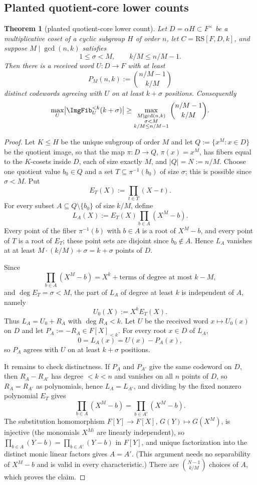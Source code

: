 \documentclass[11pt]{article}
\newtheorem{theorem}{Theorem}[section]
\theoremstyle{definition}
\theoremstyle{remark}
\newcommand{\RS}{\mathrm{RS}}
\begin{document}
\subsection{Planted quotient-core lower counts}

\begin{theorem}[planted quotient-core lower count]\label{thm:capf-planted}
Let $D=\alpha H\subset F^\times$ be a multiplicative coset of a cyclic subgroup $H$ of order $n$, let $C=\RS[F,D,k]$, and suppose $M\mid\gcd(n,k)$ satisfies
\[
        1\le \sigma<M,
        \qquad
        k/M\le n/M-1.
\]
Then there is a received word $U:D\to F$ with at least
\[
        P_M(n,k):=\binom{n/M-1}{k/M}
\]
distinct codewords agreeing with $U$ on at least $k+\sigma$ positions.  Consequently
\[
\max_U \bigl|\ImgFib_U^{<k}(k+\sigma)\bigr|
\ge
\max_{\substack{M\mid\gcd(n,k)\\ \sigma<M\\ k/M\le n/M-1}}
\binom{n/M-1}{k/M}.
\]
\end{theorem}

\begin{proof}
Let $K\le H$ be the unique subgroup of order $M$ and let $Q:=\{x^M:x\in D\}$ be the quotient image, so that the map $\pi:D\to Q$, $\pi(x)=x^M$, has fibers equal to the $K$-cosets inside $D$, each of size exactly $M$, and $|Q|=N:=n/M$.  Choose one quotient value $b_0\in Q$ and a set $T\subseteq\pi^{-1}(b_0)$ of size $\sigma$; this is possible since $\sigma<M$.  Put
\[
        E_T(X):=\prod_{t\in T}(X-t).
\]
For every subset $A\subseteq Q\setminus\{b_0\}$ of size $k/M$, define
\[
        L_A(X):=E_T(X)\prod_{b\in A}(X^M-b).
\]
Every point of the fiber $\pi^{-1}(b)$ with $b\in A$ is a root of $X^M-b$, and every point of $T$ is a root of $E_T$; these point sets are disjoint since $b_0\notin A$.  Hence $L_A$ vanishes at at least $M\cdot(k/M)+\sigma=k+\sigma$ points of $D$.

Since
\[
        \prod_{b\in A}(X^M-b)=X^k+\text{terms of degree at most }k-M,
\]
and $\deg E_T=\sigma<M$, the part of $L_A$ of degree at least $k$ is independent of $A$, namely
\[
        U_0(X):=X^kE_T(X).
\]
Thus $L_A=U_0+R_A$ with $\deg R_A<k$.  Let $U$ be the received word $x\mapsto U_0(x)$ on $D$ and let $P_A:=-R_A\in F[X]_{<k}$.  For every root $x\in D$ of $L_A$,
\[
        0=L_A(x)=U(x)-P_A(x),
\]
so $P_A$ agrees with $U$ on at least $k+\sigma$ positions.

It remains to check distinctness.  If $P_A$ and $P_{A'}$ give the same codeword on $D$, then $R_A-R_{A'}$ has degree $<k<n$ and vanishes on all $n$ points of $D$, so $R_A=R_{A'}$ as polynomials, hence $L_A=L_{A'}$, and dividing by the fixed nonzero polynomial $E_T$ gives
\[
        \prod_{b\in A}(X^M-b)=\prod_{b\in A'}(X^M-b).
\]
The substitution homomorphism $F[Y]\to F[X]$, $G(Y)\mapsto G(X^M)$, is injective \textup{(the monomials $X^{Mi}$ are linearly independent)}, so $\prod_{b\in A}(Y-b)=\prod_{b\in A'}(Y-b)$ in $F[Y]$, and unique factorization into the distinct monic linear factors gives $A=A'$.  \textup{(This argument needs no separability of $X^M-b$ and is valid in every characteristic.)}  There are $\binom{N-1}{k/M}$ choices of $A$, which proves the claim.
\end{proof}
\end{document}
